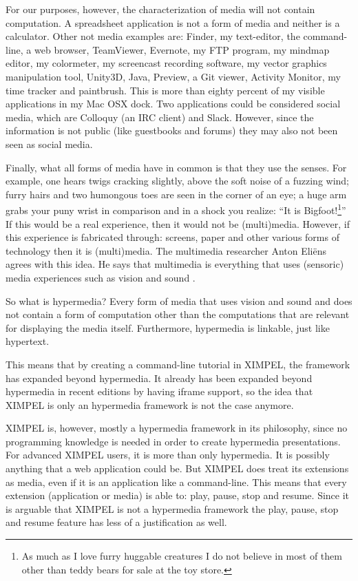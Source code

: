 For our purposes, however, the characterization of media will not contain computation. A spreadsheet application is not a form of media and neither is a calculator. Other not media examples are: Finder, my text-editor, the command-line, a web browser, TeamViewer, Evernote, my FTP program, my mindmap editor, my colormeter, my screencast recording software, my vector graphics manipulation tool, Unity3D, Java, Preview, a Git viewer, Activity Monitor, my time tracker and paintbrush. This is more than eighty percent of my visible applications in my Mac OSX dock. Two applications could be considered social media, which are Colloquy (an IRC client) and Slack. However, since the information is not public (like guestbooks and forums) they may also not been seen as social media.

Finally, what all forms of media have in common is that they use the senses. For example, one hears twigs cracking slightly, above the soft noise of a fuzzing wind; furry hairs and two humongous toes are seen in the corner of an eye; a huge arm grabs your puny wrist in comparison and in a shock you realize: ``It is Bigfoot!\footnote{As much as I love furry huggable creatures I do not believe in most of them other than teddy bears for sale at the toy store.}'' If this would be a real experience, then it would not be (multi)media. However, if this experience is fabricated through: screens, paper and other various forms of technology then it is (multi)media. The multimedia researcher Anton Eli\"ens agrees with this idea. He says that multimedia is everything that uses (sensoric) media experiences such as vision and sound \cite{eliens2017:private}.


So what is hypermedia? Every form of media that uses vision and sound and does not contain a form of computation other than the computations that are relevant for displaying the media itself. Furthermore, hypermedia is linkable, just like hypertext. 

This means that by creating a command-line tutorial in XIMPEL, the framework has expanded beyond hypermedia. It already has been expanded beyond hypermedia in recent editions by having iframe support, so the idea that XIMPEL is only an hypermedia framework is not the case anymore.

XIMPEL is, however, mostly a hypermedia framework in its philosophy, since no programming knowledge is needed in order to create hypermedia presentations. For advanced XIMPEL users, it is more than only hypermedia. It is possibly anything that a web application could be. But XIMPEL does treat its extensions as media, even if it is an application like a command-line. This means that every extension (application or media) is able to: play, pause, stop and resume. Since it is arguable that XIMPEL is not a hypermedia framework the play, pause, stop and resume feature has less of a justification as well.

